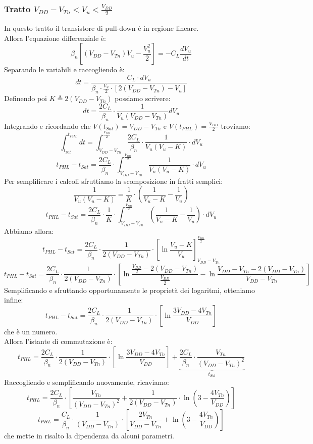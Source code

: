 \documentclass[../main.tex]{subfiles}
\begin{document}
	\subsubsection{Tratto $V_{DD} - V_{Tn} < V_u < \frac{V_{DD}}{2}$}
	In questo tratto il transistore di pull-down è in regione lineare.\\
	Allora l'equazione differenziale è:
	$$\beta_n \left[ (V_{DD} - V_{Tn}) V_u - \frac{V_u^2}{2} \right] = -C_L \frac{dV_u}{dt}$$
	Separando le variabili e raccogliendo è:
	$$dt = \frac{C_L \cdot dV_u}{\beta_n \cdot \frac{V_u}{2} \cdot [2 (V_{DD} - V_{Tn}) - V_u]}$$
	Definendo poi $K \triangleq 2 (V_{DD} - V_{Tn})$ possiamo scrivere:
	$$dt = \frac{2C_L}{\beta_n} \cdot \frac{1}{V_u (V_{DD} - V_{Tn})} dV_u$$
	Integrando e ricordando che $V(t_{Sat}) = V_{DD} - V_{Tn}$ e $V(t_{PHL}) = \frac{V_{DD}}{2}$ troviamo:
	$$\int_{t_{Sat}}^{t_{PHL}} dt = \int_{V_{DD}-V_{Tn}}^{\frac{V_{DD}}{2}} \frac{2C_L}{\beta_n} \cdot \frac{1}{V_u(V_u - K)} \cdot dV_u$$
	$$t_{PHL} - t_{Sat} = \frac{2C_L}{\beta_n} \cdot \int_{V_{DD}-V_{Tn}}^{\frac{V_{DD}}{2}} \frac{1}{V_u(V_u - K)} \cdot dV_u$$
	Per semplificare i calcoli sfruttiamo la scomposizione in fratti semplici:
	$$\frac{1}{V_u(V_u - K)} = \frac{1}{K} \cdot \left( \frac{1}{V_u - K} - \frac{1}{V_u} \right)$$
	$$t_{PHL} - t_{Sat} = \frac{2C_L}{\beta_n} \cdot \frac{1}{K} \cdot \int_{V_{DD}-V_{Tn}}^{\frac{V_{DD}}{2}} \left( \frac{1}{V_u - K} - \frac{1}{V_u} \right) \cdot dV_u$$
	Abbiamo allora:
	$$t_{PHL} - t_{Sat} = \frac{2C_L}{\beta_n} \cdot \frac{1}{2(V_{DD} - V_{Tn})} \cdot \left[ \ln \frac{V_u - K}{V_u} \right]_{V_{DD}-V_{Tn}}^{\frac{V_{DD}}{2}}$$
	$$t_{PHL} - t_{Sat} = \frac{2C_L}{\beta_n} \cdot \frac{1}{2(V_{DD} - V_{Tn})} \cdot \left[ \ln \frac{\frac{V_{DD}}{2} - 2(V_{DD} - V_{Tn})}{\frac{V_{DD}}{2}} - \ln \frac{V_{DD} - V_{Tn} - 2(V_{DD} - V_{Tn})}{V_{DD} - V_{Tn}} \right]$$
	Semplificando e sfruttando opportunamente le proprietà dei logaritmi, otteniamo infine:
	$$t_{PHL} - t_{Sat} = \frac{2C_L}{\beta_n} \cdot \frac{1}{2(V_{DD} - V_{Tn})} \cdot \left[ \ln \frac{3V_{DD} - 4V_{Tn}}{V_{DD}} \right]$$
	che è un numero.\\
	Allora l'istante di commutazione è:
	$$t_{PHL} = \frac{2C_L}{\beta_n} \cdot \frac{1}{2(V_{DD} - V_{Tn})} \cdot \left[ \ln \frac{3V_{DD} - 4V_{Tn}}{V_{DD}} \right] + \underbrace{\frac{2C_L}{\beta_n} \cdot \frac{V_{Tn}}{(V_{DD} - V_{Tn})^2}}_{t_{Sat}}$$
	Raccogliendo e semplificando nuovamente, ricaviamo:
	$$t_{PHL} = \frac{2C_L}{\beta_n} \cdot \left[ \frac{V_{Tn}}{(V_{DD} - V_{Tn})^2} + \frac{1}{2(V_{DD} - V_{Tn})} \cdot \ln \left( 3 - \frac{4V_{Tn}}{V_{DD}} \right) \right]$$
	$$t_{PHL} = \frac{C_L}{\beta_n} \cdot \frac{1}{(V_{DD} - V_{Tn})} \cdot \left[ \frac{2V_{Tn}}{V_{DD} - V_{Tn}} + \ln \left( 3 - \frac{4V_{Tn}}{V_{DD}} \right) \right]$$
	che mette in risalto la dipendenza da alcuni parametri.
\end{document}
